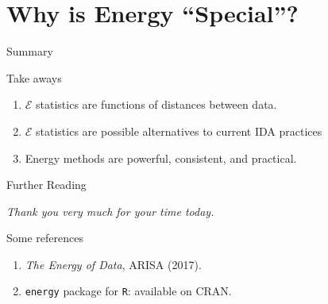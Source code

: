 \documentclass[presentation]{beamer}
\begin{document}
\section{Why is Energy ``Special''? }

\begin{frame}{Summary}
  \begin{block}{Take aways}
    \begin{enumerate}
    \item $\mathcal{E}$ statistics are functions of distances between data.
    \item $\mathcal{E}$ statistics are possible alternatives to
      current IDA practices
    \item Energy methods are powerful, consistent, and practical.
    \end{enumerate}
  \end{block}
\end{frame}

\begin{frame}{Further Reading}
  \begin{center}
    \textit{Thank you very much for your time today.}
  \end{center}

  \begin{block}{Some references}
    \begin{enumerate}
    \item \textit{The Energy of Data}, ARISA (2017).
    \item \texttt{energy} package for \texttt{R}: available on CRAN.
    \end{enumerate}
  \end{block}
\end{frame}
\end{document}

